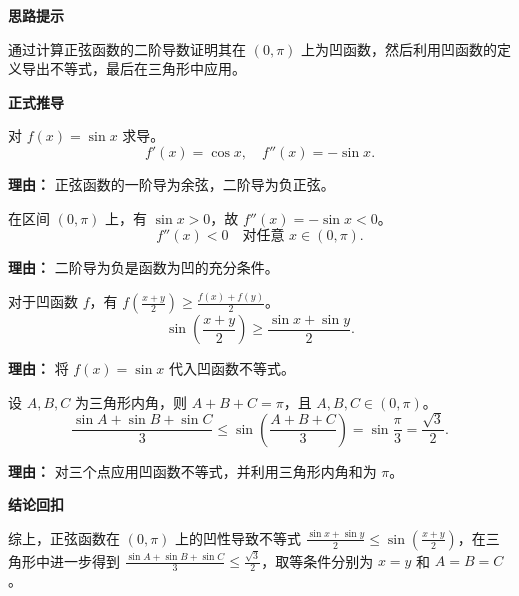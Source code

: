 \begin{proofbox}
\textbf{\textcolor{CProof}{思路提示}}

通过计算正弦函数的二阶导数证明其在 $(0, \pi)$ 上为凹函数，然后利用凹函数的定义导出不等式，最后在三角形中应用。

\medskip
\textbf{\textcolor{CProof}{正式推导}}
\begin{description}[style=nextline, leftmargin=2.8em, labelsep=0.5em, itemsep=0.55em]
    \item[\textbf{步骤一（计算导数）：}] 对 $f(x) = \sin x$ 求导。
    \[
    f'(x) = \cos x, \quad f''(x) = -\sin x.
    \]
    \par\textbf{理由：} 正弦函数的一阶导为余弦，二阶导为负正弦。

    \item[\textbf{步骤二（判断凹性）：}] 在区间 $(0, \pi)$ 上，有 $\sin x > 0$，故 $f''(x) = -\sin x < 0$。
    \[
    f''(x) < 0 \quad \text{对任意 } x \in (0, \pi).
    \]
    \par\textbf{理由：} 二阶导为负是函数为凹的充分条件。

    \item[\textbf{步骤三（应用凹性）：}] 对于凹函数 $f$，有 $f\left(\frac{x+y}{2}\right) \geq \frac{f(x)+f(y)}{2}$。
    \[
    \sin\!\left(\frac{x+y}{2}\right) \geq \frac{\sin x + \sin y}{2}.
    \]
    \par\textbf{理由：} 将 $f(x)=\sin x$ 代入凹函数不等式。

    \item[\textbf{步骤四（三角形推广）：}] 设 $A, B, C$ 为三角形内角，则 $A+B+C=\pi$，且 $A, B, C \in (0, \pi)$。
    \[
    \frac{\sin A + \sin B + \sin C}{3} \leq \sin\!\left(\frac{A+B+C}{3}\right) = \sin\frac{\pi}{3} = \frac{\sqrt{3}}{2}.
    \]
    \par\textbf{理由：} 对三个点应用凹函数不等式，并利用三角形内角和为 $\pi$。
\end{description}

\medskip
\textbf{\textcolor{CProof}{结论回扣}}

综上，正弦函数在 $(0, \pi)$ 上的凹性导致不等式 $\frac{\sin x + \sin y}{2} \leq \sin\left(\frac{x+y}{2}\right)$，在三角形中进一步得到 $\frac{\sin A + \sin B + \sin C}{3} \leq \frac{\sqrt{3}}{2}$，取等条件分别为 $x=y$ 和 $A=B=C$。
\end{proofbox}
